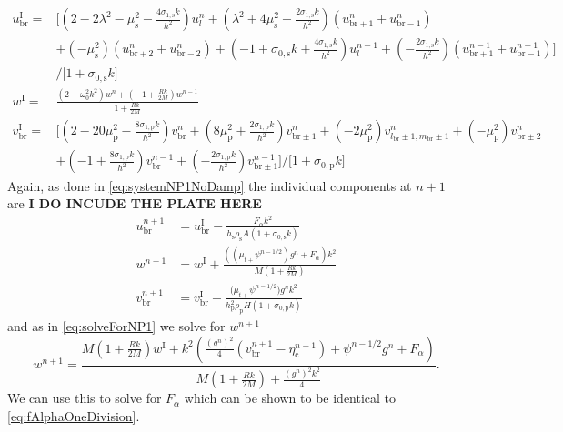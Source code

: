 \documentclass{article}
\begin{document}
\begin{subequations}\label{eq:intermediateDampFact}
    \begin{align}
        u^\text{I}_\text{br} = &\Big[(2-2\lambda^2-\mu_\text{s}^2-\frac{4\sigma_{1,\text{s}}k}{h^2})u_l^n + (\lambda^2 + 4\mu_\text{s}^2+\frac{2\sigma_{1,\text{s}}k}{h^2})(u_{\text{br}+1}^n + u_{\text{br}-1}^n)\nonumber\\
        &+ (-\mu_\text{s}^2)(u_{\text{br}+2}^n+u_{\text{br}-2}^n)+ (-1 + \sigma_{0,\text{s}}k+\frac{4\sigma_{1,\text{s}}k}{h^2})u_l^{n-1}+(-\frac{2\sigma_{1,\text{s}}k}{h^2})(u_{\text{br}+1}^{n-1} + u_{\text{br}-1}^{n-1})\Big]\\
        &/ \Big[1 + \sigma_{0,\text{s}}k\Big] \nonumber\\
        w^\text{I} = & \frac{(2-\omega_0^2k^2)w^n+(-1+\frac{Rk}{2M})w^{n-1}}{1+\frac{Rk}{2M}}\\
        v^\text{I}_\text{br} =& \Big[(2-20\mu^2_\text{p}-\frac{8\sigma_{1,\text{p}}k}{h^2})v_\text{br}^n+(8\mu_\text{p}^2+\frac{2\sigma_{1,\text{p}}k}{h^2})v_{\text{br}\pm1}^n+ (-2\mu_\text{p}^2)v_{l_\text{br}\pm1,m_\text{br}\pm1}^n+(-\mu_\text{p}^2)v_{\text{br}\pm2}^n\\
        &+(-1 + \frac{8\sigma_{1,\text{p}}k}{h^2})v_\text{br}^{n-1}+(-\frac{2\sigma_{1,\text{p}}k}{h^2})v_{\text{br}\pm1}^{n-1}\Big]/\Big[1+\sigma_{0,\text{p}}k\Big]\nonumber
    \end{align}
\end{subequations}
Again, as done in \eqref{eq:systemNP1NoDamp} the individual components at $n+1$ are \textbf{I DO INCUDE THE PLATE HERE}
\begin{subequations}
\begin{align}
    u_\text{br}^{n+1}&=u_\text{br}^\text{I} - \frac{F_\alpha k^2}{h_\text{s}\rho_\text{s}A(1+\sigma_{0,\text{s}}k)}\\
        w^{n+1} &= w^\text{I} + \frac{((\mu_{t+}\psi^{n-1/2})g^n + F_\alpha)k^2}{M (1+\frac{Rk}{2M})}\\
        v_\text{br}^{n+1} &= v_\text{br}^\text{I} - \frac{\big(\mu_{t+}\psi^{n-1/2}\big)g^nk^2}{h_\text{p}^2\rho_\text{p}H(1+\sigma_{0,\text{p}}k)}
        \end{align}
\end{subequations}
and as in \eqref{eq:solveForNP1} we solve for $w^{n+1}$
\begin{equation}
    w^{n+1} = \frac{M(1+\frac{Rk}{2M})w^\text{I}+k^2\left(\frac{(g^n)^2}{4}(v_\text{br}^{n+1}-\eta_\text{c}^{n-1})+\psi^{n-1/2}g^n+F_\alpha\right)}{M(1+\frac{Rk}{2M})+\frac{(g^n)^2k^2}{4}}.
\end{equation}
We can use this to solve for $F_\alpha$ which can be shown to be identical to \eqref{eq:fAlphaOneDivision}.
\end{document}
